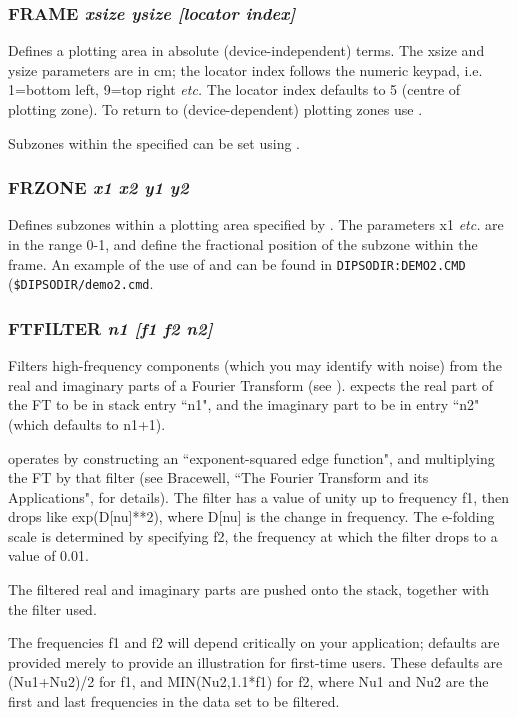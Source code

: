 \documentclass[twoside,11pt,noabs,nolof]{starlink}
\providecommand{\dipcom}[3]{\subsubsection*{\label{COM:#1}\xlabel{COM:#1}\textbf{#1} \emph{#2}}}
\begin{document}
\dipcom{FRAME}{xsize ysize [locator index]}{Sets up a plotting area of a given absolute size}
Defines a plotting area in absolute (device-independent) terms. The
xsize and ysize parameters are in cm; the locator index follows the
numeric keypad, i.e. 1=bottom left, 9=top right \emph{etc.} The
locator index defaults to 5 (centre of plotting zone). To return to
(device-dependent) plotting zones use .

Subzones within the specified   can be set using .

\dipcom{FRZONE}{x1 x2 y1 y2}{Divides a plotting area (set up by {\texttt{FRAME}})  into several sub-frames}
Defines subzones within a plotting area specified by .  The
parameters x1 \emph{etc.} are in the range 0-1, and define the
fractional position of the subzone within the frame. An example of the
use of   and   can be found in {\texttt{DIPSODIR:DEMO2.CMD}}
({\texttt{\$DIPSODIR/demo2.cmd}}.

\dipcom{FTFILTER}{n1 [f1 f2 n2]}{Filters high frequency components from a Fourier transform}
Filters high-frequency components (which you may identify with noise)
from the real and imaginary parts of a Fourier Transform (see ).
  expects the real part of the FT to be in stack entry ``n1",
and the imaginary part to be in entry ``n2" (which defaults to n1+1).

  operates by constructing an ``exponent-squared edge
function", and multiplying the FT by that filter (see Bracewell, ``The
Fourier Transform and its Applications", for details). The filter has
a value of unity up to frequency f1, then drops like exp(D[nu]**2),
where D[nu] is the change in frequency. The e-folding scale is
determined by specifying f2, the frequency at which the filter drops
to a value of 0.01.

The filtered real and imaginary parts are pushed onto the stack,
together with the filter used.

The frequencies f1 and f2 will depend critically on your application;
defaults are provided merely to provide an illustration for first-time
users. These defaults are (Nu1+Nu2)/2 for f1, and MIN(Nu2,1.1*f1) for
f2, where Nu1 and Nu2 are the first and last frequencies in the
data set to be filtered.
\end{document}
